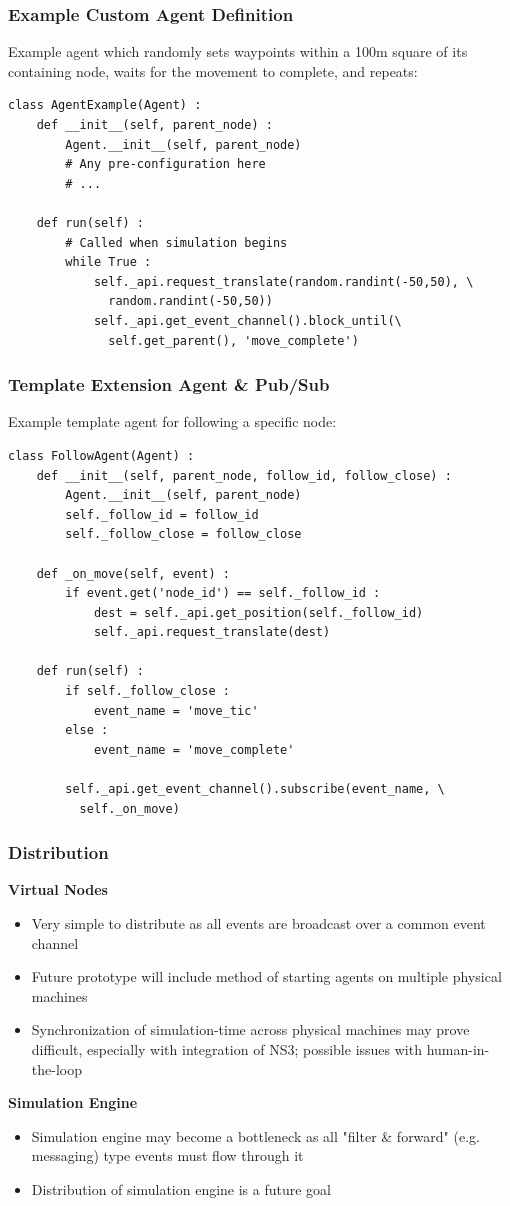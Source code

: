 \documentclass[mathserif]{beamer}
\begin{document}
\begin{frame}[fragile]
    \frametitle{Example Custom Agent Definition}
    Example agent which randomly sets waypoints within a 100m square of its containing node, waits for the movement to complete, and repeats:
    \begin{verbatim}
class AgentExample(Agent) :
    def __init__(self, parent_node) :
        Agent.__init__(self, parent_node)
        # Any pre-configuration here
        # ...

    def run(self) :
        # Called when simulation begins
        while True :
            self._api.request_translate(random.randint(-50,50), \ 
              random.randint(-50,50))
            self._api.get_event_channel().block_until(\
              self.get_parent(), 'move_complete')
    \end{verbatim}
\end{frame}

\begin{frame}[fragile]
    \frametitle{Template Extension Agent \& Pub/Sub}
    Example template agent for following a specific node:

    \begin{verbatim}
class FollowAgent(Agent) :
    def __init__(self, parent_node, follow_id, follow_close) :
        Agent.__init__(self, parent_node)
        self._follow_id = follow_id
        self._follow_close = follow_close

    def _on_move(self, event) :
        if event.get('node_id') == self._follow_id :
            dest = self._api.get_position(self._follow_id)
            self._api.request_translate(dest)

    def run(self) :
        if self._follow_close :
            event_name = 'move_tic'
        else :
            event_name = 'move_complete'

        self._api.get_event_channel().subscribe(event_name, \
          self._on_move)
    \end{verbatim}
\end{frame}

\frame
{
    \frametitle{Distribution}
    \textbf{Virtual Nodes}
    \begin{itemize}
	\item Very simple to distribute as all events are broadcast over a common event channel
	\item Future prototype will include method of starting agents on multiple physical machines
	\item Synchronization of simulation-time across physical machines may prove difficult, especially with integration of NS3; possible issues with human-in-the-loop
    \end{itemize}
    \textbf{Simulation Engine}
    \begin{itemize}
	\item Simulation engine may become a bottleneck as all "filter \& forward" (e.g. messaging) type events must flow through it
	\item Distribution of simulation engine is a future goal 
    \end{itemize}
}
\end{document}

